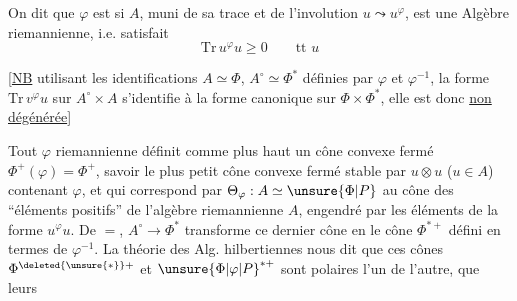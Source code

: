On dit que  \deleted{\unsure{$\varphi$|$\Phi$}} $\varphi$ est \deleted{\unsure{$\varphi$}} \uline{} si $A$,
muni de sa trace et de l'involution $u\leadsto u^\varphi$, est
une Algèbre riemannienne, i.e. satisfait
\[
\mathrm{Tr}\,u^\varphi u\geq0\qquad \text{tt }u
\]

[\uline{NB} utilisant les identifications $A\simeq\Phi$, $A^\circ\simeq\Phi^*$
définies par $\varphi$ et $\varphi^{-1}$, la forme $\mathrm{Tr}\,v^\varphi u$
sur $A^\circ\times A$ s'identifie à la forme canonique
sur $\Phi\times\Phi^*$, elle est donc \uline{non dégénérée}]

Tout $\varphi$ riemannienne définit comme plus
haut un cône convexe fermé $\Phi^+(\varphi)=\Phi^+$,
savoir le plus petit cône convexe fermé
stable par $u\otimes u$ ($u\in A$) contenant $\varphi$, et qui
correspond par $\Theta_\varphi:A\simeq\unsure{\Phi|P}$ au cône des
``éléments positifs'' de l'algèbre  riemannienne
$A$, engendré par les éléments de la forme
$u^\varphi u$. De $=$, $A^\circ\longrightarrow\Phi^*$ transforme ce dernier
cône en le cône $\Phi^{*+}$ défini en termes
de $\varphi^{-1}$. La théorie des Alg. hilbertiennes
nous dit que ces cônes $\Phi^{\deleted{\unsure{*}}+}$ et $\unsure{\Phi|\varphi|P}^{*+}$ sont
polaires l'un de l'autre,  que leurs
